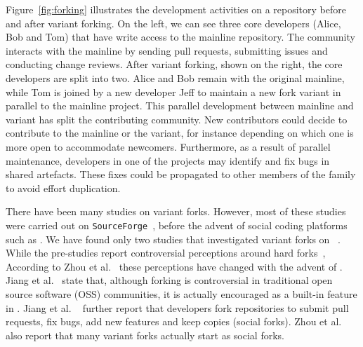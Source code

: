 Figure~\ref{fig:forking} illustrates the development activities on a repository before and after variant forking.
On the left, we can see three core developers (Alice, Bob and Tom) that have write access to the mainline repository.
The community interacts with the mainline by sending pull requests, submitting issues and conducting change reviews.
After variant forking, shown on the right, the core developers are split into two.
Alice and Bob remain with the original mainline, while Tom is joined by a new developer Jeff to maintain a new fork variant in parallel to the mainline project.
This parallel development between mainline and variant has split the contributing community. New contributors could decide to contribute to the mainline or the variant, for instance depending on which one is more open to accommodate newcomers.
Furthermore, as a result of parallel maintenance, developers in one of the projects may identify and fix bugs in shared artefacts.
These fixes could be propagated to other members of the family to avoid effort duplication.

There have been many studies on variant forks. However, most of these studies were carried out on \texttt{SourceForge}~\cite{Linus:2012Perspectives,Gregorio:2012,Viseur:2012Forks,Linus:2013CodeForking,Laurent:2008,Linus:2011ToFork}, before the advent of social coding platforms such as \gh.
We have found only two studies that investigated variant forks on \gh~\cite{businge2018appfamilies,Zhou:2020}.
While the pre-\gh studies report controversial perceptions around hard forks~\cite{Chua:Forking:2017,Dixion:2009Forks,Ernst:2010,Linus:2011ToFork,Linus:2014Hackers,Raymond:Cathedral:2001},
According to Zhou et al.~\cite{Zhou:2020} these perceptions have changed with the advent of \gh. Jiang et al.~\cite{Lo:2017} state that, although forking is controversial in traditional open source software (OSS) communities, it is actually encouraged as a built-in feature in \gh. Jiang et al. ~\cite{Lo:2017} further report that developers fork repositories to submit pull requests, fix bugs, add new features and keep copies (social forks).
Zhou et al.~\cite{Zhou:2020} also report that many variant forks actually start as social forks.

